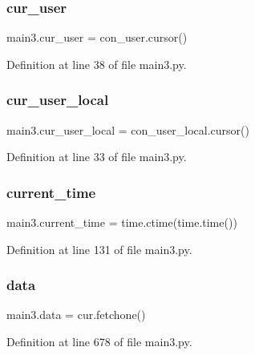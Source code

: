 \subsubsection{\texorpdfstring{cur\+\_\+user}{cur\_user}}
{\footnotesize\ttfamily main3.\+cur\+\_\+user = con\+\_\+user.\+cursor()}



Definition at line 38 of file main3.\+py.

\mbox{\label{namespacemain3_a2fa22d0a5dd912937396dd96363ff968}} 
\subsubsection{\texorpdfstring{cur\+\_\+user\+\_\+local}{cur\_user\_local}}
{\footnotesize\ttfamily main3.\+cur\+\_\+user\+\_\+local = con\+\_\+user\+\_\+local.\+cursor()}



Definition at line 33 of file main3.\+py.

\mbox{\label{namespacemain3_aa03fad60889e4cdf61e6898d8ef9617e}} 
\subsubsection{\texorpdfstring{current\+\_\+time}{current\_time}}
{\footnotesize\ttfamily main3.\+current\+\_\+time = time.\+ctime(time.\+time())}



Definition at line 131 of file main3.\+py.

\mbox{\label{namespacemain3_af3b593054c807ee934bbbca0f4964a15}} 
\subsubsection{\texorpdfstring{data}{data}}
{\footnotesize\ttfamily main3.\+data = cur.\+fetchone()}



Definition at line 678 of file main3.\+py.

\mbox{\label{namespacemain3_a49b33cac6f362fbef2ac40a65b883fde}} 
